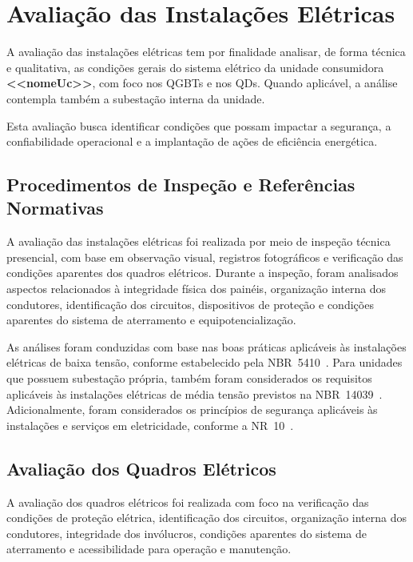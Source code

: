 \chapter{Avaliação das Instalações Elétricas}

A avaliação das instalações elétricas tem por finalidade analisar, de forma
técnica e qualitativa, as condições gerais do sistema elétrico da unidade
consumidora \textbf{<<nomeUc>>}, com foco nos \ac{QGBTs} e nos \ac{QDs}. Quando aplicável, a análise contempla também a subestação interna da unidade.

Esta avaliação busca identificar condições que possam impactar a segurança, a
confiabilidade operacional e a implantação de ações de eficiência energética.

\section{Procedimentos de Inspeção e Referências Normativas}

A avaliação das instalações elétricas foi realizada por meio de inspeção técnica
presencial, com base em observação visual, registros fotográficos e verificação
das condições aparentes dos quadros elétricos. Durante a inspeção, foram
analisados aspectos relacionados à integridade física dos painéis, organização
interna dos condutores, identificação dos circuitos, dispositivos de proteção e
condições aparentes do sistema de aterramento e equipotencialização.

As análises foram conduzidas com base nas boas práticas aplicáveis às instalações
elétricas de baixa tensão, conforme estabelecido pela NBR~5410~\cite{nbr5410}. 
Para unidades que possuem subestação própria, também foram considerados os 
requisitos aplicáveis às instalações elétricas de média tensão previstos na 
NBR~14039~\cite{nbr14039}. Adicionalmente, foram considerados os princípios de segurança aplicáveis às instalações e serviços em eletricidade, conforme a NR~10~\cite{nr10}.

\section{Avaliação dos Quadros Elétricos}


A avaliação dos quadros elétricos foi realizada  
com foco na verificação das condições de proteção elétrica, identificação dos 
circuitos, organização interna dos condutores, integridade dos invólucros, 
condições aparentes do sistema de aterramento e acessibilidade para operação e 
manutenção.

